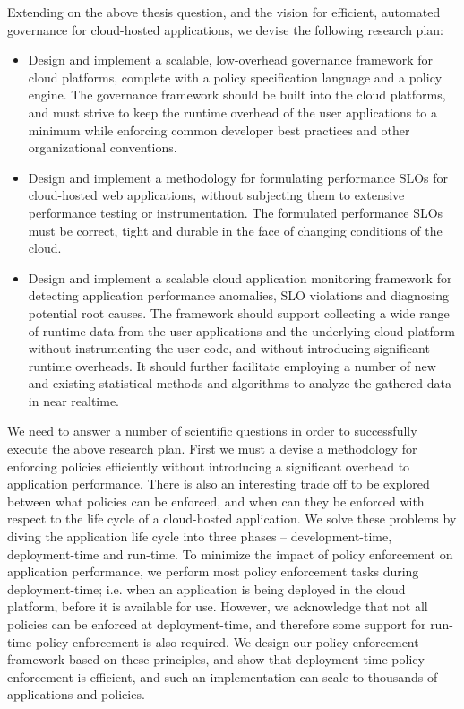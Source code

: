 Extending on the above thesis question, and the vision for efficient, automated governance for
cloud-hosted applications, we devise the following research plan:

\begin{itemize}
\item Design and implement a scalable, low-overhead governance framework for cloud platforms,
complete with a policy specification language and a policy engine. The governance framework should be
built into the cloud platforms, and must
strive to keep the runtime overhead of the user applications to a minimum while enforcing
common developer best practices and other organizational conventions.
\item Design and implement a methodology for formulating performance SLOs for cloud-hosted 
 web applications, without
 subjecting them to extensive performance testing or instrumentation. The formulated
 performance SLOs must be correct, tight and durable in the face of changing
 conditions of the cloud.
 \item Design and implement a scalable cloud application monitoring framework for detecting
application performance anomalies, SLO violations and diagnosing potential root causes. 
The framework should support collecting
 a wide range of runtime data from the user applications and the underlying cloud platform
 without instrumenting the user code, and without introducing significant runtime overheads.
 It should further facilitate employing a number of new and existing statistical methods
 and algorithms to analyze the gathered data in near realtime.
\end{itemize}

We need to answer a number of scientific questions in order to successfully execute the 
above research plan. First we must a devise a methodology for enforcing policies efficiently
without introducing a significant overhead to application performance. There is also an interesting
trade off to be explored between what policies can be enforced, and when can they be enforced with respect
to the life cycle of a cloud-hosted application. We solve these problems by diving the application
life cycle into three phases -- development-time, deployment-time and run-time. To minimize the
impact of policy enforcement on application performance, we perform most policy
enforcement tasks during deployment-time; i.e. when an application is being deployed in the 
cloud platform, before it is available for use. However, we acknowledge that not all policies
can be enforced at deployment-time, and therefore some support for run-time policy enforcement
is also required. We design our policy enforcement framework based on these principles, and 
show that deployment-time policy enforcement is efficient, and such an implementation can scale
to thousands of applications and policies.

